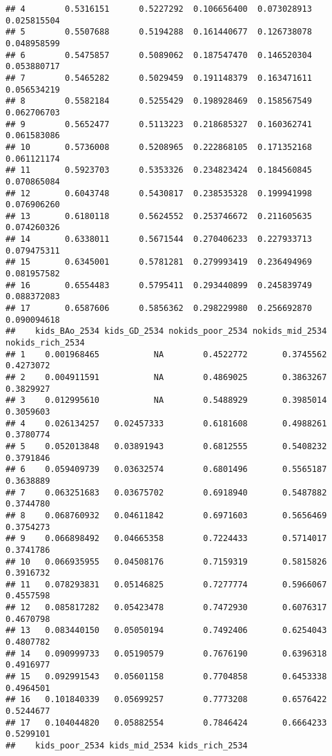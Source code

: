 \documentclass[
]{article}
\begin{document}
\begin{verbatim}
## 4        0.5316151      0.5227292  0.106656400  0.073028913   0.025815504
## 5        0.5507688      0.5194288  0.161440677  0.126738078   0.048958599
## 6        0.5475857      0.5089062  0.187547470  0.146520304   0.053880717
## 7        0.5465282      0.5029459  0.191148379  0.163471611   0.056534219
## 8        0.5582184      0.5255429  0.198928469  0.158567549   0.062706703
## 9        0.5652477      0.5113223  0.218685327  0.160362741   0.061583086
## 10       0.5736008      0.5208965  0.222868105  0.171352168   0.061121174
## 11       0.5923703      0.5353326  0.234823424  0.184560845   0.070865084
## 12       0.6043748      0.5430817  0.238535328  0.199941998   0.076906260
## 13       0.6180118      0.5624552  0.253746672  0.211605635   0.074260326
## 14       0.6338011      0.5671544  0.270406233  0.227933713   0.079475311
## 15       0.6345001      0.5781281  0.279993419  0.236494969   0.081957582
## 16       0.6554483      0.5795411  0.293440899  0.245839749   0.088372083
## 17       0.6587606      0.5856362  0.298229980  0.256692870   0.090094618
##    kids_BAo_2534 kids_GD_2534 nokids_poor_2534 nokids_mid_2534 nokids_rich_2534
## 1    0.001968465           NA        0.4522772       0.3745562        0.4273072
## 2    0.004911591           NA        0.4869025       0.3863267        0.3829927
## 3    0.012995610           NA        0.5488929       0.3985014        0.3059603
## 4    0.026134257   0.02457333        0.6181608       0.4988261        0.3780774
## 5    0.052013848   0.03891943        0.6812555       0.5408232        0.3791846
## 6    0.059409739   0.03632574        0.6801496       0.5565187        0.3638889
## 7    0.063251683   0.03675702        0.6918940       0.5487882        0.3744780
## 8    0.068760932   0.04611842        0.6971603       0.5656469        0.3754273
## 9    0.066898492   0.04665358        0.7224433       0.5714017        0.3741786
## 10   0.066935955   0.04508176        0.7159319       0.5815826        0.3916732
## 11   0.078293831   0.05146825        0.7277774       0.5966067        0.4557598
## 12   0.085817282   0.05423478        0.7472930       0.6076317        0.4670798
## 13   0.083440150   0.05050194        0.7492406       0.6254043        0.4807782
## 14   0.090999733   0.05190579        0.7676190       0.6396318        0.4916977
## 15   0.092991543   0.05601158        0.7704858       0.6453338        0.4964501
## 16   0.101840339   0.05699257        0.7773208       0.6576422        0.5244677
## 17   0.104044820   0.05882554        0.7846424       0.6664233        0.5299101
##    kids_poor_2534 kids_mid_2534 kids_rich_2534

\end{verbatim}
\end{document}
